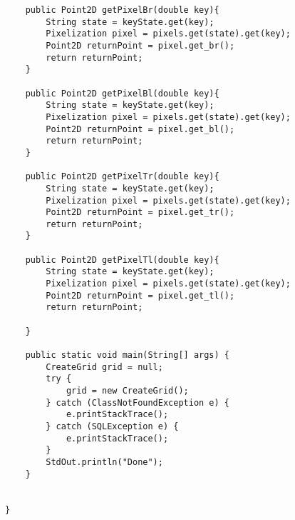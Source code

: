 \begin{verbatim}
    public Point2D getPixelBr(double key){
        String state = keyState.get(key);
        Pixelization pixel = pixels.get(state).get(key);
        Point2D returnPoint = pixel.get_br();
        return returnPoint;
    }

    public Point2D getPixelBl(double key){
        String state = keyState.get(key);
        Pixelization pixel = pixels.get(state).get(key);
        Point2D returnPoint = pixel.get_bl();
        return returnPoint;
    }

    public Point2D getPixelTr(double key){
        String state = keyState.get(key);
        Pixelization pixel = pixels.get(state).get(key);
        Point2D returnPoint = pixel.get_tr();
        return returnPoint;
    }

    public Point2D getPixelTl(double key){
        String state = keyState.get(key);
        Pixelization pixel = pixels.get(state).get(key);
        Point2D returnPoint = pixel.get_tl();
        return returnPoint;

    }

    public static void main(String[] args) {
        CreateGrid grid = null;
        try {
            grid = new CreateGrid();
        } catch (ClassNotFoundException e) {
            e.printStackTrace();
        } catch (SQLException e) {
            e.printStackTrace();
        }
        StdOut.println("Done");
    }


}
\end{verbatim}

